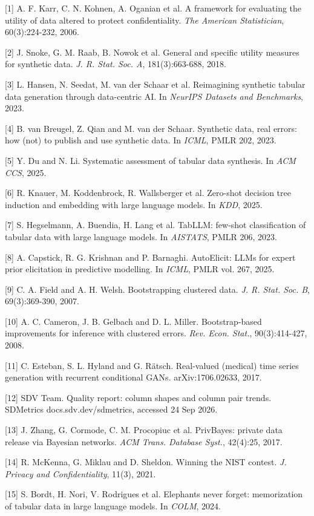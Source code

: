 \documentclass[10pt,a4paper,twocolumn]{article}
\begin{document}
[1] A. F. Karr, C. N. Kohnen, A. Oganian et al. A framework for evaluating the
utility of data altered to protect confidentiality. \textit{The American Statistician},
60(3):224-232, 2006.



[2] J. Snoke, G. M. Raab, B. Nowok et al. General and specific utility measures
for synthetic data. \textit{J. R. Stat. Soc. A}, 181(3):663-688, 2018.



[3] L. Hansen, N. Seedat, M. van der Schaar et al. Reimagining synthetic tabular
data generation through data-centric AI. In \textit{NeurIPS Datasets and Benchmarks},
2023.



[4] B. van Breugel, Z. Qian and M. van der Schaar. Synthetic data, real errors:
how (not) to publish and use synthetic data. In \textit{ICML}, PMLR 202, 2023.



[5] Y. Du and N. Li. Systematic assessment of tabular data synthesis. In \textit{ACM CCS}, 2025.



[6] R. Knauer, M. Koddenbrock, R. Wallsberger et al. Zero-shot decision tree
induction and embedding with large language models. In \textit{KDD}, 2025.



[7] S. Hegselmann, A. Buendia, H. Lang et al. TabLLM: few-shot classification of
tabular data with large language models. In \textit{AISTATS}, PMLR 206, 2023.



[8] A. Capstick, R. G. Krishnan and P. Barnaghi. AutoElicit: LLMs for expert
prior elicitation in predictive modelling. In \textit{ICML}, PMLR vol. 267, 2025.

[9] C. A. Field and A. H. Welsh. Bootstrapping clustered data. \textit{J. R. Stat. Soc. B}, 69(3):369-390, 2007.



[10] A. C. Cameron, J. B. Gelbach and D. L. Miller. Bootstrap-based improvements
for inference with clustered errors. \textit{Rev. Econ. Stat.}, 90(3):414-427, 2008.



[11] C. Esteban, S. L. Hyland and G. Rätsch. Real-valued (medical) time series
generation with recurrent conditional GANs. arXiv:1706.02633, 2017.



[12] SDV Team. Quality report: column shapes and column pair trends. SDMetrics
docs.sdv.dev/sdmetrics, accessed 24 Sep 2026.



[13] J. Zhang, G. Cormode, C. M. Procopiuc et al. PrivBayes: private data
release via Bayesian networks. \textit{ACM Trans. Database Syst.}, 42(4):25, 2017.



[14] R. McKenna, G. Miklau and D. Sheldon. Winning the NIST contest. \textit{J. Privacy and Confidentiality}, 11(3), 2021.



[15] S. Bordt, H. Nori, V. Rodrigues et al. Elephants never forget: memorization
of tabular data in large language models. In \textit{COLM}, 2024.
\end{document}
